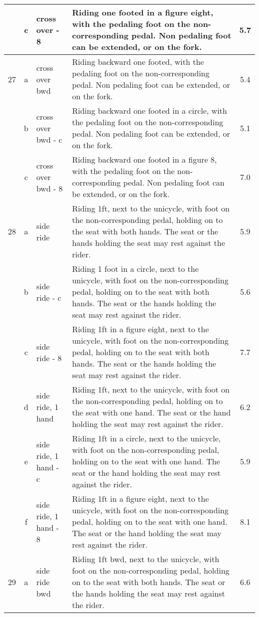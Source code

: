 \begin{longtable}{|r|c|p{4cm}|p{8cm}|c|}
  & c & cross over - 8  & Riding one footed in a figure eight, with the pedaling foot on the non-corresponding pedal. Non pedaling foot can be extended, or on the fork.  & 5.7 \\ 
\hline
27  & a & cross over bwd  & Riding backward one footed, with the pedaling foot on the non-corresponding pedal. Non pedaling foot can be extended, or on the fork. & 5.4 \\ 
\hline
  & b & cross over bwd - c  & Riding backward one footed in a circle, with the pedaling foot on the non-corresponding pedal. Non pedaling foot can be extended, or on the fork. & 5.1 \\ 
\hline
  & c & cross over bwd - 8  & Riding backward one footed in a figure 8, with the pedaling foot on the non-corresponding pedal. Non pedaling foot can be extended, or on the fork. & 7.0 \\ 
\hline
28  & a & side ride & Riding 1ft, next to the unicycle, with foot on the non-corresponding pedal, holding on to the seat with both hands. The seat or the hands holding the seat may rest against the rider.  & 5.9 \\ 
\hline
  & b & side ride - c & Riding 1 foot in a circle, next to the unicycle, with foot on the non-corresponding pedal, holding on to the seat with both hands. The seat or the hands holding the seat may rest against the rider. & 5.6 \\ 
\hline
  & c & side ride - 8 & Riding 1ft in a figure eight, next to the unicycle, with foot on the non-corresponding pedal, holding on to the seat with both hands. The seat or the hands holding the seat may rest against the rider.  & 7.7 \\ 
\hline
  & d & side ride, 1 hand & Riding 1ft, next to the unicycle, with foot on the non-corresponding pedal, holding on to the seat with one hand. The seat or the hand holding the seat may rest against the rider. & 6.2 \\ 
\hline
  & e & side ride, 1 hand - c & Riding 1ft in a circle, next to the unicycle, with foot on the non-corresponding pedal, holding on to the seat with one hand. The seat or the hand holding the seat may rest against the rider. & 5.9 \\ 
\hline
  & f & side ride, 1 hand - 8 & Riding 1ft in a figure eight, next to the unicycle, with foot on the non-corresponding pedal, holding on to the seat with one hand. The seat or the hand holding the seat may rest against the rider. & 8.1 \\ 
\hline
29  & a & side ride bwd & Riding 1ft bwd, next to the unicycle, with foot on the non-corresponding pedal, holding on to the seat with both hands. The seat or the hands holding the seat may rest against the rider.  & 6.6 \\ 

\end{longtable}
